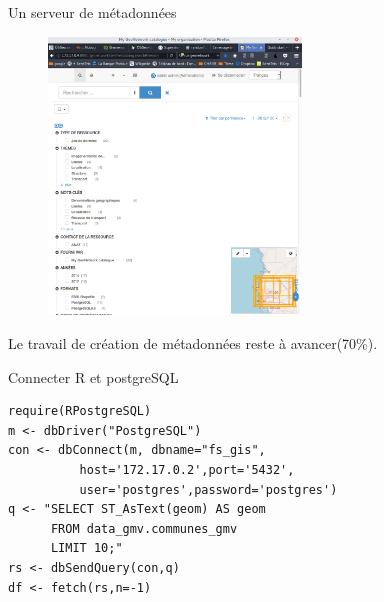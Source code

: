 \documentclass[newPxFont]{beamer}
\begin{document}
\begin{frame}[c]{Un serveur de métadonnées}
\vspace{-2em}
\begin{figure}
	\centering
	\includegraphics[width = 0.6\textwidth]{img/geonetwork}
\end{figure}
Le travail de création de métadonnées reste à avancer(70\%).
\end{frame}

\begin{frame}[fragile]{Connecter R et postgreSQL}
\vspace{-2em}
\begin{verbatim}
require(RPostgreSQL)
m <- dbDriver("PostgreSQL")
con <- dbConnect(m, dbname="fs_gis",
          host='172.17.0.2',port='5432',
          user='postgres',password='postgres')
q <- "SELECT ST_AsText(geom) AS geom
      FROM data_gmv.communes_gmv
      LIMIT 10;"
rs <- dbSendQuery(con,q)
df <- fetch(rs,n=-1)
\end{verbatim}
\end{frame}
\end{document}
